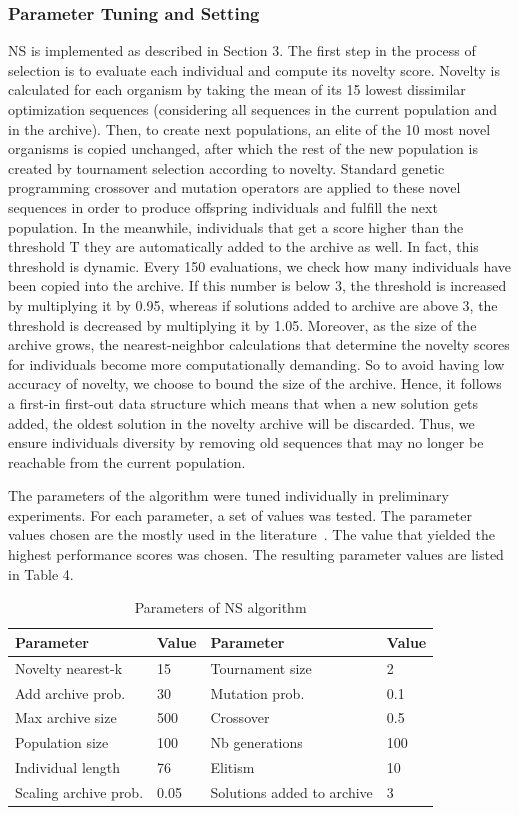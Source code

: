 \subsubsection{Parameter Tuning and Setting}
NS is implemented as described in Section 3.
The first step in the process of selection is to evaluate each individual and compute its novelty score. Novelty is calculated for each organism by taking the mean of its 15 lowest dissimilar optimization sequences (considering all sequences in the current population and in the archive). 
Then, to create next populations, an elite of the 10 most novel organisms is copied unchanged, after which the rest of the new population is created by tournament selection according to novelty. Standard genetic programming crossover and mutation operators are applied to these novel sequences in order to produce offspring individuals and fulfill the next population.
In the meanwhile, individuals that get a score higher than the threshold T they are automatically added to the archive as well. 
In fact, this threshold is dynamic. Every 150 evaluations, we check how many individuals have been copied into the archive. If this number is below 3, the threshold is increased by multiplying it by 0.95, whereas if solutions added to archive are above 3, the threshold is decreased by multiplying it by 1.05. 
Moreover, as the size of the archive grows, the nearest-neighbor calculations that determine the novelty scores for individuals become more computationally demanding. So to avoid having low accuracy of novelty, we choose to bound the size of the archive. Hence, it follows a first-in first-out data structure which means that when a new solution gets added, the oldest solution in the novelty archive will be discarded. Thus, we ensure individuals diversity by removing old sequences that may no longer be reachable from the current population.

The parameters of the algorithm were tuned individually in preliminary experiments. For each parameter, a set of values was tested. The parameter values chosen are the mostly used in the literature~\cite{lehman2008exploiting}. The value that yielded the highest performance scores was chosen. The resulting parameter values are listed in Table 4.
\begin{table}
	\caption{Parameters of NS algorithm}
	\begin{tabular}{ l l || l l }
		Parameter & Value & Parameter & Value \\	\hline
		Novelty nearest-k  & 15 &  Tournament size & 2\\ 
		Add archive prob. & 30 &  Mutation prob. & 0.1\\  
		Max archive size & 500 &  Crossover & 0.5  \\  
		Population size & 100 &  Nb generations &  100 \\  
		Individual length & 76 & Elitism & 10  \\ 
		Scaling archive prob. & 0.05 & Solutions added to archive & 3  \\ 
	\end{tabular}
\end{table}

